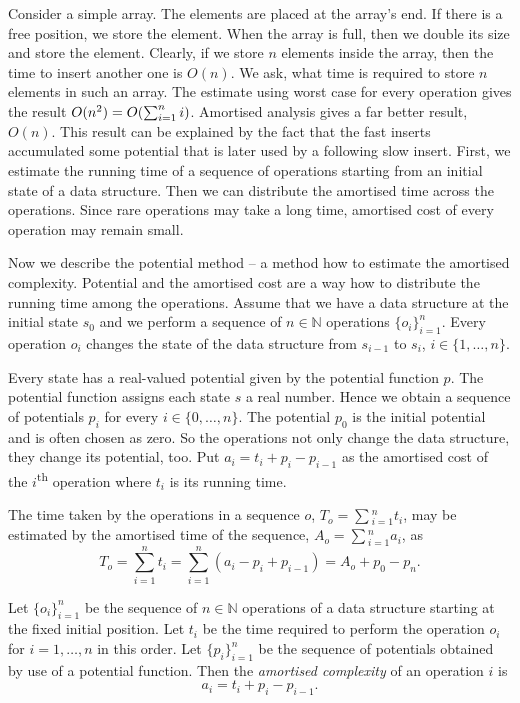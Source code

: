Consider a simple array. The elements are placed at the array's end. If there is a free position, we store the element. When the array is full, then we double its size and store the element. Clearly, if we store $n$ elements inside the array, then the time to insert another one is $O(n)$. We ask, what time is required to store $n$ elements in such an array. The estimate using worst case for every operation gives the result $O(n ^ 2) =O(\sum\displaylimits_{i = 1}^{n} i)$. Amortised analysis gives a far better result, $O(n)$. This result can be explained by the fact that the fast inserts accumulated some potential that is later used by a following slow insert. First, we estimate the running time of a sequence of operations starting from an initial state of a data structure. Then we can distribute the amortised time across the operations. Since rare operations may take a long time, amortised cost of every operation may remain small.

Now we describe the potential method -- a method how to estimate the amortised complexity. Potential and the amortised cost are a way how to distribute the running time among the operations. Assume that we have a data structure at the initial state $s_0$ and we perform a sequence of $n \in \mathbb{N}$ operations $\{o_i\}_{i = 1}^{n}$. Every operation $o_i$ changes the state of the data structure from $s_{i - 1}$ to $s_i$, $i \in \{1, \dots, n\}$. 

Every state has a real-valued potential given by the potential function $p$. The potential function assigns each state $s$ a real number. Hence we obtain a sequence of potentials $p_i$ for every $i \in \{0, \dots, n\}$. The potential $p_0$ is the initial potential and is often chosen as zero. So the operations not only change the data structure, they change its potential, too. Put $a_i = t_i + p_{i} - p_{i - 1}$ as the amortised cost of the $i$\textsuperscript{th} operation where $t_i$ is its running time. 

The time taken by the operations in a sequence $o$, $T_o = \sum\displaystyle_{i = 1}^{n} t_i$, may be estimated by the amortised time of the sequence, $A_o = \sum\displaystyle_{i = 1}^{n} a_i$, as
\[
	T_o = \displaystyle\sum_{i = 1}^{n} t_i = \displaystyle\sum_{i = 1}^{n} (a_i - p_i + p_{i - 1}) = A_o + p_0 - p_n \text{.}
\]

\begin{definition}
Let $\{o_i\}_{i = 1}^{n}$ be the sequence of $n \in \mathbb{N}$ operations of a data structure starting at the fixed initial position. Let $t_i$ be the time required to perform the operation $o_i$ for $i = 1, \dots, n$ in this order. Let $\{p_i\}_{i = 1}^{n}$ be the sequence of potentials obtained by use of a potential function. Then the \emph{amortised complexity} of an operation $i$ is \[ a_i = t_i + p_i - p_{i - 1} \text{.} \]
\end{definition}

